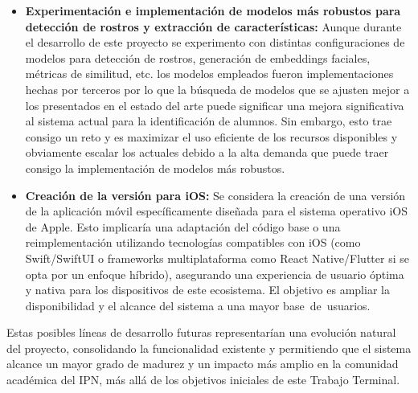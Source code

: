 \begin{itemize}
	\item \textbf{Experimentación e implementación de modelos más robustos para detección de rostros y extracción de características:} Aunque durante el desarrollo de este proyecto se experimento con distintas configuraciones de modelos para detección de rostros, generación de embeddings faciales, métricas de similitud, etc. los modelos empleados fueron implementaciones hechas por terceros por lo que la búsqueda de modelos que se ajusten mejor a los presentados en el estado del arte puede significar una mejora significativa al sistema actual para la identificación de alumnos. Sin embargo, esto trae consigo un reto y es maximizar el uso eficiente de los recursos disponibles y obviamente escalar los actuales debido a la alta demanda que puede traer consigo la implementación de modelos más robustos.
	
	\item \textbf{Creación de la versión para iOS:} Se considera la creación de una versión de la aplicación móvil específicamente diseñada para el sistema operativo iOS de Apple. Esto implicaría una adaptación del código base o una reimplementación utilizando tecnologías compatibles con iOS (como Swift/SwiftUI o frameworks multiplataforma como React Native/Flutter si se opta por un enfoque híbrido), asegurando una experiencia de usuario óptima y nativa para los dispositivos de este ecosistema. El objetivo es ampliar la disponibilidad y el alcance del sistema a una mayor base de usuarios.
	
\end{itemize}

Estas posibles líneas de desarrollo futuras representarían una evolución natural del proyecto, consolidando la funcionalidad existente y permitiendo que el sistema alcance un mayor grado de madurez y un impacto más amplio en la comunidad académica del IPN, más allá de los objetivos iniciales de este Trabajo Terminal.



